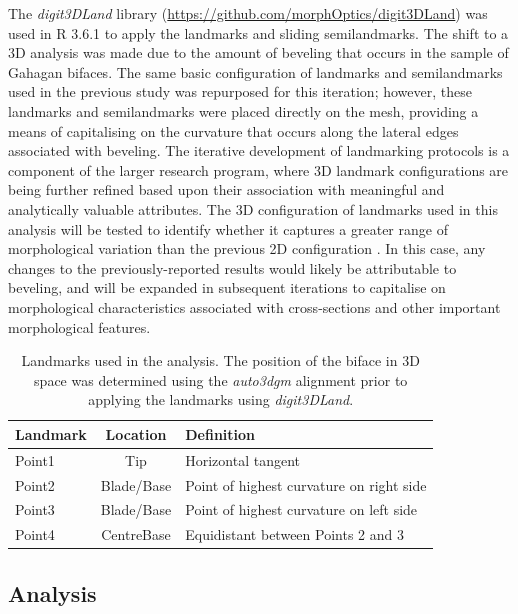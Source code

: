 \documentclass[review]{elsarticle}
\begin{document}
The \textit{digit3DLand} library (\href{https://github.com/morphOptics/digit3DLand}{https://github.com/morphOptics/digit3DLand}) was used in R 3.6.1 \citep{R} to apply the landmarks and sliding semilandmarks. The shift to a 3D analysis was made due to the amount of beveling that occurs in the sample of Gahagan bifaces. The same basic configuration of landmarks and semilandmarks used in the previous study \citep[Figure 3]{RN11783} was repurposed for this iteration; however, these landmarks and semilandmarks were placed directly on the mesh, providing a means of capitalising on the curvature that occurs along the lateral edges associated with beveling. The iterative development of landmarking protocols is a component of the larger research program, where 3D landmark configurations are being further refined based upon their association with meaningful and analytically valuable attributes. The 3D configuration of landmarks used in this analysis will be tested to identify whether it captures a greater range of morphological variation than the previous 2D configuration \citep[Figure 3]{RN11783}. In this case, any changes to the previously-reported results would likely be attributable to beveling, and will be expanded in subsequent iterations to capitalise on morphological characteristics associated with cross-sections and other important morphological features.

\begin{table}[tbh]\centering
\footnotesize
\caption{Landmarks used in the analysis. The position of the biface in 3D space was determined using the \textit{auto3dgm} alignment prior to applying the landmarks using \textit{digit3DLand}.}
\centering
\begin{tabular}{lcp{7.5cm}}
\toprule
Landmark & Location & Definition\\
\midrule
Point1 & Tip & Horizontal tangent\\
Point2 & Blade/Base & Point of highest curvature on right side\\
Point3 & Blade/Base & Point of highest curvature on left side\\
Point4 & CentreBase & Equidistant between Points 2 and 3\\
\bottomrule
\end{tabular}
\label{tab:Tbl1}
\end{table}

\subsection*{Analysis}
\end{document}
